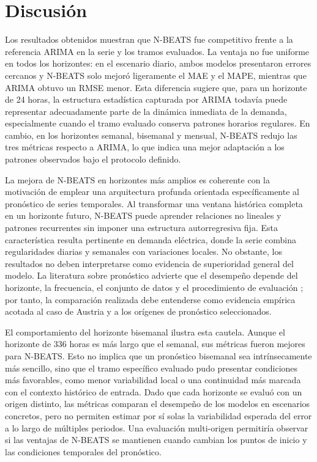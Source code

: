 \section{Discusión}

Los resultados obtenidos muestran que N-BEATS fue competitivo frente a la referencia ARIMA en la serie y los tramos evaluados. La ventaja no fue uniforme en todos los horizontes: en el escenario diario, ambos modelos presentaron errores cercanos y N-BEATS solo mejoró ligeramente el MAE y el MAPE, mientras que ARIMA obtuvo un RMSE menor. Esta diferencia sugiere que, para un horizonte de 24 horas, la estructura estadística capturada por ARIMA todavía puede representar adecuadamente parte de la dinámica inmediata de la demanda, especialmente cuando el tramo evaluado conserva patrones horarios regulares. En cambio, en los horizontes semanal, bisemanal y mensual, N-BEATS redujo las tres métricas respecto a ARIMA, lo que indica una mejor adaptación a los patrones observados bajo el protocolo definido.

La mejora de N-BEATS en horizontes más amplios es coherente con la motivación de emplear una arquitectura profunda orientada específicamente al pronóstico de series temporales. Al transformar una ventana histórica completa en un horizonte futuro, N-BEATS puede aprender relaciones no lineales y patrones recurrentes sin imponer una estructura autorregresiva fija. Esta característica resulta pertinente en demanda eléctrica, donde la serie combina regularidades diarias y semanales con variaciones locales. No obstante, los resultados no deben interpretarse como evidencia de superioridad general del modelo. La literatura sobre pronóstico advierte que el desempeño depende del horizonte, la frecuencia, el conjunto de datos y el procedimiento de evaluación \parencites{hyndman2021,petropoulos2022}; por tanto, la comparación realizada debe entenderse como evidencia empírica acotada al caso de Austria y a los orígenes de pronóstico seleccionados.

El comportamiento del horizonte bisemanal ilustra esta cautela. Aunque el horizonte de 336 horas es más largo que el semanal, sus métricas fueron mejores para N-BEATS. Esto no implica que un pronóstico bisemanal sea intrínsecamente más sencillo, sino que el tramo específico evaluado pudo presentar condiciones más favorables, como menor variabilidad local o una continuidad más marcada con el contexto histórico de entrada. Dado que cada horizonte se evaluó con un origen distinto, las métricas comparan el desempeño de los modelos en escenarios concretos, pero no permiten estimar por sí solas la variabilidad esperada del error a lo largo de múltiples periodos. Una evaluación multi-origen permitiría observar si las ventajas de N-BEATS se mantienen cuando cambian los puntos de inicio y las condiciones temporales del pronóstico.

